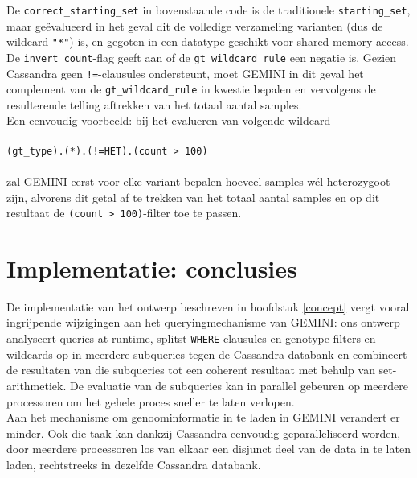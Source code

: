 

\noindent De \texttt{correct\_starting\_set} in bovenstaande code is de traditionele \texttt{starting\_set}, maar ge\"evalueerd in het geval dit de volledige verzameling varianten (dus de wildcard \texttt{"*"}) is, en gegoten in een datatype geschikt voor shared-memory access.\\
De \texttt{invert\_count}-flag geeft aan of de \texttt{gt\_wildcard\_rule} een negatie is. Gezien Cassandra geen \texttt{!=}-clausules ondersteunt, moet GEMINI in dit geval het complement van de \texttt{gt\_wildcard\_rule} in kwestie bepalen en vervolgens de resulterende telling aftrekken van het totaal aantal samples. \\ Een eenvoudig voorbeeld: bij het evalueren van volgende wildcard \\\\ 
\texttt{(gt\_type).(*).(!=HET).(count > 100)}\\\\
zal GEMINI eerst voor elke variant bepalen hoeveel samples w\'el heterozygoot zijn, alvorens dit getal af te trekken van het totaal aantal samples en op dit resultaat de \texttt{(count > 100)}-filter toe te passen.

\section{Implementatie: conclusies}

De implementatie van het ontwerp beschreven in hoofdstuk \ref{concept} vergt vooral ingrijpende wijzigingen aan het queryingmechanisme van GEMINI: ons ontwerp analyseert queries at runtime, splitst \texttt{WHERE}-clausules en genotype-filters en -wildcards op in meerdere subqueries tegen de Cassandra databank en combineert de resultaten van die subqueries tot een coherent resultaat met behulp van set-arithmetiek. De evaluatie van de subqueries kan in parallel gebeuren op meerdere processoren om het gehele proces sneller te laten verlopen.\\
Aan het mechanisme om genoominformatie in te laden in GEMINI verandert er minder. Ook die taak kan dankzij Cassandra eenvoudig geparalleliseerd worden, door meerdere processoren los van elkaar een disjunct deel van de data in te laten laden, rechtstreeks in dezelfde Cassandra databank.
